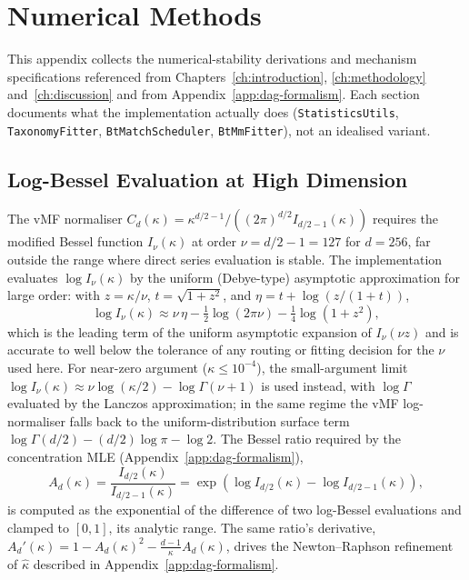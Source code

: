 \chapter{Numerical Methods}\label{app:numerics}

This appendix collects the numerical-stability derivations and
mechanism specifications referenced from
Chapters~\ref{ch:introduction}, \ref{ch:methodology}
and~\ref{ch:discussion} and from Appendix~\ref{app:dag-formalism}.
Each section documents what the implementation actually does
(\texttt{StatisticsUtils}, \texttt{TaxonomyFitter},
\texttt{BtMatchScheduler}, \texttt{BtMmFitter}), not an idealised
variant.

\section{Log-Bessel Evaluation at High Dimension}\label{sec:num-bessel}

The vMF normaliser $C_d(\kappa) = \kappa^{d/2-1} / \left((2\pi)^{d/2}
I_{d/2-1}(\kappa)\right)$ requires the modified Bessel function
$I_\nu(\kappa)$ at order $\nu = d/2 - 1 = 127$ for $d = 256$, far
outside the range where direct series evaluation is stable.
The implementation evaluates $\log I_\nu(\kappa)$ by the uniform
(Debye-type) asymptotic approximation for large order: with
$z = \kappa / \nu$, $t = \sqrt{1 + z^2}$, and
$\eta = t + \log\!\left(z / (1 + t)\right)$,
\[
\log I_\nu(\kappa)
\approx \nu\,\eta
- \tfrac{1}{2}\log\!\left(2\pi\nu\right)
- \tfrac{1}{4}\log\!\left(1 + z^2\right),
\]
which is the leading term of the uniform asymptotic expansion of
$I_\nu(\nu z)$ and is accurate to well below the tolerance of any
routing or fitting decision for the $\nu$ used here.
For near-zero argument ($\kappa \leq 10^{-4}$), the small-argument
limit $\log I_\nu(\kappa) \approx \nu \log(\kappa/2) -
\log\Gamma(\nu + 1)$ is used instead, with $\log\Gamma$ evaluated by
the Lanczos approximation; in the same regime the vMF log-normaliser
falls back to the uniform-distribution surface term
$\log\Gamma(d/2) - (d/2)\log\pi - \log 2$.
The Bessel ratio required by the concentration MLE
(Appendix~\ref{app:dag-formalism}),
\[
A_d(\kappa) = \frac{I_{d/2}(\kappa)}{I_{d/2-1}(\kappa)}
= \exp\!\left(\log I_{d/2}(\kappa) - \log I_{d/2-1}(\kappa)\right),
\]
is computed as the exponential of the difference of two log-Bessel
evaluations and clamped to $[0, 1]$, its analytic range.
The same ratio's derivative,
$A_d'(\kappa) = 1 - A_d(\kappa)^2 - \tfrac{d-1}{\kappa} A_d(\kappa)$,
drives the Newton--Raphson refinement of
$\hat{\kappa}$ described in Appendix~\ref{app:dag-formalism}.

